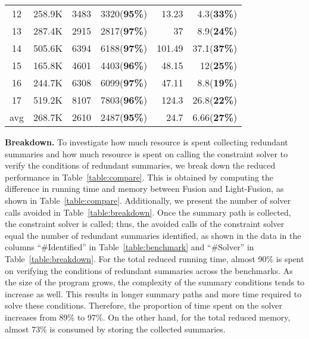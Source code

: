 \begin{table}[]
{\begin{tabular}{cr|rr|rr}
\multicolumn{1}{c|}{12}                 & 258.9K                                         & 3483                  & 3320(\textbf{95\%})    & 13.23                 & 4.3(\textbf{33\%})    \\
\multicolumn{1}{c|}{13}                 & 287.4K                                         & 2915                  & 2817(\textbf{97\%})    & 37                    & 8.9(\textbf{24\%})    \\
\multicolumn{1}{c|}{14}                 & 505.6K                                         & 6394                  & 6188(\textbf{97\%})    & 101.49                & 37.1(\textbf{37\%})   \\ \hline
\multicolumn{1}{c|}{15}                 & 165.8K                                         & 4601                  & 4403(\textbf{96\%})    & 48.15                 & 12(\textbf{25\%})     \\
\multicolumn{1}{c|}{16}                 & 244.7K                                         & 6308                  & 6099(\textbf{97\%})    & 47.11                 & 8.8(\textbf{19\%})    \\
\multicolumn{1}{c|}{17}                 & 519.2K                                         & 8107                  & 7803(\textbf{96\%})    & 124.3                 & 26.8(\textbf{22\%})   \\ \hline
\multicolumn{1}{c|}{avg}                & 268.7K                                         & 2610                  & 2487(\textbf{95\%})    & 24.7                  & 6.66(\textbf{27\%})   \\ \hline
\end{tabular}

}
\vspace{-0.4cm}
\end{table}




\textbf{Breakdown.}
To investigate how much resource is spent collecting redundant summaries and how much resource is spent on calling the constraint solver to verify the conditions of redundant summaries, we break down the reduced performance in Table~\ref{table:compare}. 
This is obtained by computing the difference in running time and memory between Fusion and Light-Fusion, as shown in Table~\ref{table:compare}. 
Additionally, we present the number of solver calls avoided in Table~\ref{table:breakdown}.
Once the summary path is collected, the constraint solver is called; thus, the avoided calls of the constraint solver equal the number of redundant summaries identified, 
as shown in the data in the columns ``\#Identified'' in Table~\ref{table:benchmark} and ``\#Solver'' in Table~\ref{table:breakdown}.
For the total reduced running time, almost 90\% is spent on verifying the conditions of redundant summaries across the benchmarks. 
As the size of the program grows, the complexity of the summary conditions tends to increase as well. 
This results in longer summary paths and more time required to solve these conditions. 
Therefore, the proportion of time spent on the solver increases from 89\% to 97\%.
On the other hand, for the total reduced memory, almost 73\% is consumed by storing the collected summaries.


